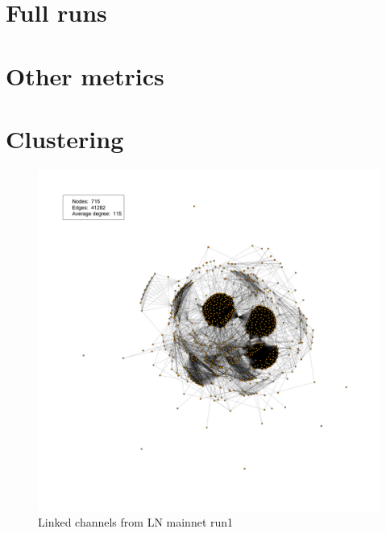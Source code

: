 \section{Full runs}

\section{Other metrics}

\section{Clustering}

\begin{figure}[h]
    \centering
    \includegraphics[width=14cm]{figures/graphs/cg_ln_mainnet_run1.png}
    \caption{Linked channels from LN mainnet run1}
    \label{fig:channelGraphLNTS}
\end{figure}

